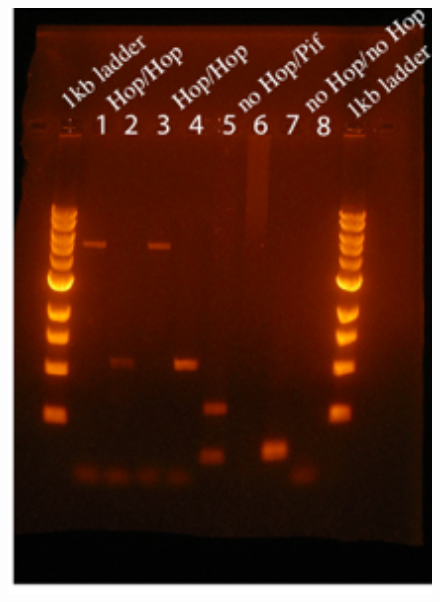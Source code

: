 \documentclass[11pt]{article}
\begin{document}
\begin{linenumbers}
\begin{flushleft}
\begin{figure}[!t]
  \begin{center}
   \includegraphics[width=150mm]{FigS2Gel.png}
\label{FigS2Gel}
  \end{center}
\end{figure}


\end{flushleft}
\end{linenumbers}
\end{document}
